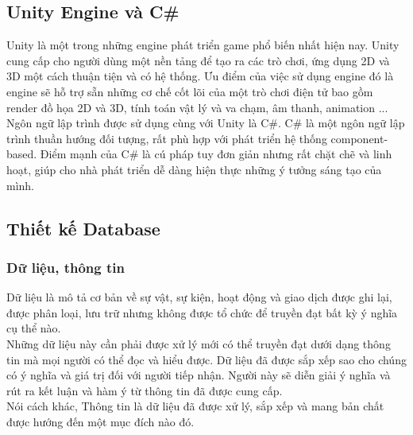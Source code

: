 \subsection{Unity Engine và C\#}
Unity là một trong những engine phát triển game phổ biến nhất hiện nay. Unity cung cấp cho người dùng một nền tảng để tạo ra các trò chơi, ứng dụng 2D và 3D một cách thuận tiện và có hệ thống. Ưu điểm của việc sử dụng engine đó là engine sẽ hỗ trợ sẵn những cơ chế cốt lõi của một trò chơi điện tử bao gồm render đồ họa 2D và 3D, tính toán vật lý và va chạm, âm thanh, animation ...\\
Ngôn ngữ lập trình được sử dụng cùng với Unity là C\#. C\# là một ngôn ngữ lập trình thuần hướng đối tượng, rất phù hợp với phát triển hệ thống component-based. Điểm mạnh của C\# là cú pháp tuy đơn giản nhưng rất chặt chẽ và linh hoạt, giúp cho nhà phát triển dễ dàng hiện thực những ý tưởng sáng tạo của mình.\\
\subsection{Thiết kế Database}
\subsubsection{Dữ liệu, thông tin}
\hspace*{0.5cm} Dữ liệu là mô tả cơ bản về sự vật, sự kiện, hoạt động và giao dịch được ghi lại, được phân loại, lưu trữ nhưng không được tổ chức để truyền đạt bất kỳ ý nghĩa cụ thể nào.\\
\hspace*{0.5cm} Những dữ liệu này cần phải được xử lý mới có thể truyền đạt dưới dạng thông tin mà mọi người có thể đọc và hiểu được. Dữ liệu đã được sắp xếp sao cho chúng có ý nghĩa và giá trị đối với người tiếp nhận. Người này sẽ diễn giải ý nghĩa và rút ra kết luận và hàm ý từ thông tin đã được cung cấp. \\
\hspace*{0.5cm} Nói cách khác, Thông tin là dữ liệu đã được xử lý, sắp xếp và mang bản chất được hướng đến một mục đích nào đó.
